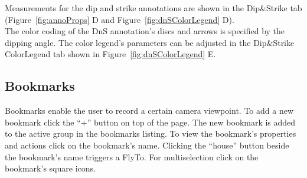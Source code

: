 Measurements for the dip and strike annotations are shown in the Dip\&Strike tab (Figure~\ref{fig:annoProps} D and Figure~\ref{fig:dnSColorLegend} D).\\

The color coding of the DnS annotation's discs and arrows is specified by the dipping angle. The color legend's parameters can be adjusted in the
Dip\&Strike ColorLegend tab shown in Figure~\ref{fig:dnSColorLegend} E.

%



\subsection{Bookmarks}
\label{sec:bookmarks}

	
Bookmarks enable the user to record a certain camera viewpoint.
To add a new bookmark click the ``+'' button on top of the page. The new bookmark is added to the active group in the bookmarks listing.
To view the bookmark's properties and actions click on the bookmark's name. Clicking the ``house'' button beside the bookmark's name triggers a FlyTo. For multiselection click on the bookmark's square icons.

